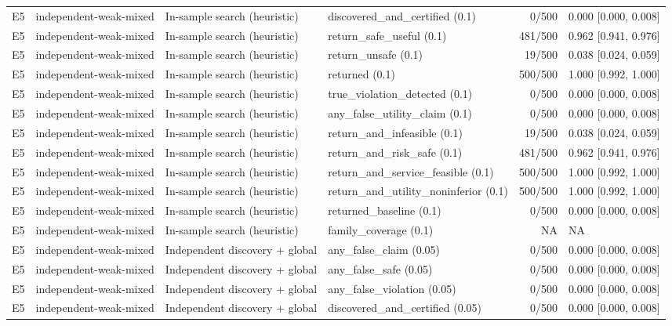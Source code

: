 \begin{longtable}{p{.04\linewidth}p{.18\linewidth}p{.19\linewidth}p{.16\linewidth}r p{.21\linewidth}}
E5 & independent-weak-mixed & In-sample search (heuristic) & discovered\_and\_certified (0.1) & 0/500 & 0.000 [0.000, 0.008]\\
E5 & independent-weak-mixed & In-sample search (heuristic) & return\_safe\_useful (0.1) & 481/500 & 0.962 [0.941, 0.976]\\
E5 & independent-weak-mixed & In-sample search (heuristic) & return\_unsafe (0.1) & 19/500 & 0.038 [0.024, 0.059]\\
E5 & independent-weak-mixed & In-sample search (heuristic) & returned (0.1) & 500/500 & 1.000 [0.992, 1.000]\\
E5 & independent-weak-mixed & In-sample search (heuristic) & true\_violation\_detected (0.1) & 0/500 & 0.000 [0.000, 0.008]\\
E5 & independent-weak-mixed & In-sample search (heuristic) & any\_false\_utility\_claim (0.1) & 0/500 & 0.000 [0.000, 0.008]\\
E5 & independent-weak-mixed & In-sample search (heuristic) & return\_and\_infeasible (0.1) & 19/500 & 0.038 [0.024, 0.059]\\
E5 & independent-weak-mixed & In-sample search (heuristic) & return\_and\_risk\_safe (0.1) & 481/500 & 0.962 [0.941, 0.976]\\
E5 & independent-weak-mixed & In-sample search (heuristic) & return\_and\_service\_feasible (0.1) & 500/500 & 1.000 [0.992, 1.000]\\
E5 & independent-weak-mixed & In-sample search (heuristic) & return\_and\_utility\_noninferior (0.1) & 500/500 & 1.000 [0.992, 1.000]\\
E5 & independent-weak-mixed & In-sample search (heuristic) & returned\_baseline (0.1) & 0/500 & 0.000 [0.000, 0.008]\\
E5 & independent-weak-mixed & In-sample search (heuristic) & family\_coverage (0.1) & NA & NA\\
E5 & independent-weak-mixed & Independent discovery + global & any\_false\_claim (0.05) & 0/500 & 0.000 [0.000, 0.008]\\
E5 & independent-weak-mixed & Independent discovery + global & any\_false\_safe (0.05) & 0/500 & 0.000 [0.000, 0.008]\\
E5 & independent-weak-mixed & Independent discovery + global & any\_false\_violation (0.05) & 0/500 & 0.000 [0.000, 0.008]\\
E5 & independent-weak-mixed & Independent discovery + global & discovered\_and\_certified (0.05) & 0/500 & 0.000 [0.000, 0.008]\\

\end{longtable}
